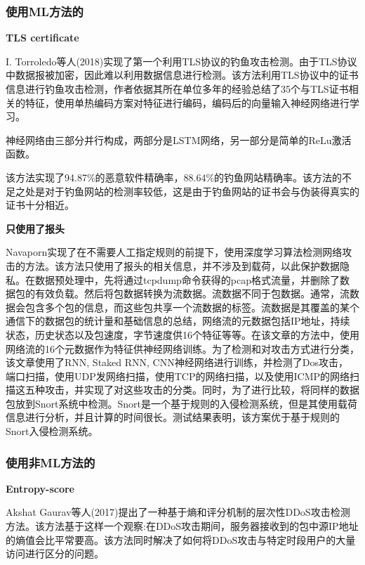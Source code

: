 \documentclass[11pt]{article} %
\begin{document}
\subsubsection{使用ML方法的}
\label{ml}

\textbf{TLS certificate}

I. Torroledo等人(2018)实现了第一个利用TLS协议的钓鱼攻击检测。由于TLS协议中数据报被加密，因此难以利用数据信息进行检测。该方法利用TLS协议中的证书信息进行钓鱼攻击检测，作者依据其所在单位多年的经验总结了35个与TLS证书相关的特征，使用单热编码方案对特征进行编码，编码后的向量输入神经网络进行学习。

神经网络由三部分并行构成，两部分是LSTM网络，另一部分是简单的ReLu激活函数。

该方法实现了94.87\%的恶意软件精确率，88.64\%的钓鱼网站精确率。该方法的不足之处是对于钓鱼网站的检测率较低，这是由于钓鱼网站的证书会与伪装得真实的证书十分相近。

\textbf{只使用了报头}

Navaporn实现了在不需要人工指定规则的前提下，使用深度学习算法检测网络攻击的方法。该方法只使用了报头的相关信息，并不涉及到载荷，以此保护数据隐私。在数据预处理中，先将通过tcpdump命令获得的pcap格式流量，并删除了数据包的有效负载。然后将包数据转换为流数据。流数据不同于包数据。通常，流数据会包含多个包的信息，而这些包共享一个流数据的标签。流数据是其覆盖的某个通信下的数据包的统计量和基础信息的总结，网络流的元数据包括IP地址，持续状态，历史状态以及包速度，字节速度供16个特征等等。在该文章的方法中，使用网络流的16个元数据作为特征供神经网络训练。为了检测和对攻击方式进行分类，该文章使用了RNN, Staked RNN, CNN神经网络进行训练，并检测了Dos攻击， 端口扫描，使用UDP发网络扫描，使用TCP的网络扫描，以及使用ICMP的网络扫描这五种攻击，并实现了对这些攻击的分类。同时，为了进行比较，将同样的数据包放到Snort系统中检测。Snort是一个基于规则的入侵检测系统，但是其使用载荷信息进行分析，并且计算的时间很长。测试结果表明，该方案优于基于规则的Snort入侵检测系统。

\textbf{}

\subsubsection{使用非ML方法的}
\label{nonml}

\textbf{Entropy-score}

Akshat Gaurav等人(2017)提出了一种基于熵和评分机制的层次性DDoS攻击检测方法。该方法基于这样一个观察:在DDoS攻击期间，服务器接收到的包中源IP地址的熵值会比平常要高。该方法同时解决了如何将DDoS攻击与特定时段用户的大量访问进行区分的问题。
\end{document}
